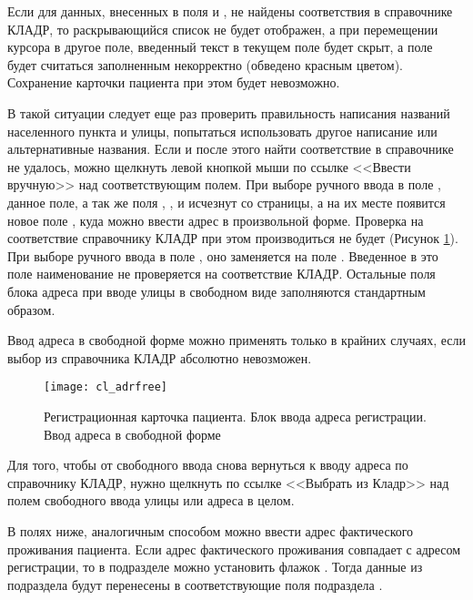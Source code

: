 {Если для данных, внесенных в поля  и , не найдены соответствия в справочнике КЛАДР, то раскрывающийся список не будет отображен, а при перемещении курсора в другое поле, введенный текст в текущем поле будет скрыт, а поле будет считаться заполненным некорректно (обведено красным цветом). Сохранение карточки пациента при этом будет невозможно. 

В такой ситуации следует еще раз проверить правильность написания названий населенного пункта и улицы, попытаться использовать другое написание или альтернативные названия. Если и после этого найти соответствие в справочнике не удалось, можно щелкнуть левой кнопкой мыши по ссылке <<Ввести вручную>> над соответствующим полем. При выборе ручного ввода в поле , данное поле, а так же поля , ,  и  исчезнут со страницы, а на их месте появится новое поле , куда можно ввести адрес в произвольной форме. Проверка на соответствие справочнику КЛАДР при этом производиться не будет (Рисунок \ref{img_cl_adrfree}). При выборе ручного ввода в поле , оно заменяется на поле . Введенное в это поле наименование не проверяется на соответствие КЛАДР. Остальные поля блока адреса при вводе улицы в свободном виде заполняются стандартным образом.

\begin{vnim}
Ввод адреса в свободной форме можно применять только в крайних случаях, если выбор из справочника КЛАДР абсолютно невозможен. 
\end{vnim}

\begin{figure}[ht]\centering
 \texttt{[image: cl\_adrfree]}
 \caption{Регистрационная карточка пациента. Блок ввода адреса регистрации. Ввод адреса в свободной форме}
 \label{img_cl_adrfree}
\end{figure}   

\begin{prim}
Для того, чтобы от свободного ввода снова вернуться к вводу адреса по справочнику КЛАДР, нужно щелкнуть по ссылке <<Выбрать из Кладр>> над полем свободного ввода улицы или адреса в целом.
\end{prim}

В полях ниже, аналогичным способом можно ввести адрес фактического проживания пациента. Если адрес фактического проживания совпадает с адресом регистрации, то в подразделе  можно установить флажок . Тогда данные из подраздела  будут перенесены в соответствующие поля подраздела . %

}
